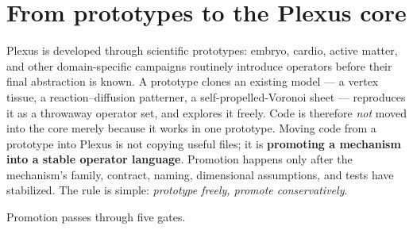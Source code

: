 \documentclass[11pt]{article}
\begin{document}
\section{From prototypes to the Plexus core}
\label{sec:promotion}

Plexus is developed through scientific prototypes: embryo, cardio, active matter,
and other domain-specific campaigns routinely introduce operators before their final
abstraction is known. A prototype clones an existing model --- a vertex tissue, a
reaction--diffusion patterner, a self-propelled-Voronoi sheet --- reproduces it as a
throwaway operator set, and explores it freely. Code is therefore \emph{not} moved
into the core merely because it works in one prototype. Moving code from a prototype
into Plexus is not copying useful files; it is \textbf{promoting a mechanism into a
stable operator language}. Promotion happens only after the mechanism's family,
contract, naming, dimensional assumptions, and tests have stabilized. The rule is
simple: \emph{prototype freely, promote conservatively}.

Promotion passes through five gates.
\end{document}
